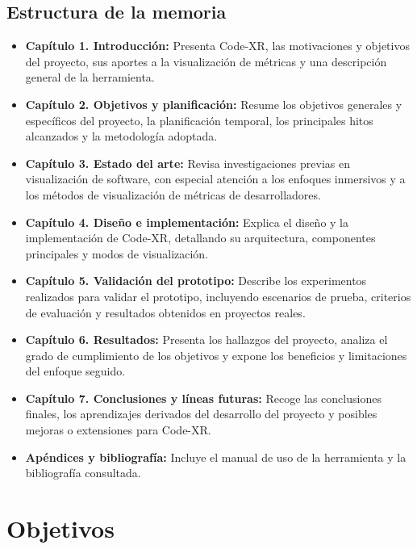 \documentclass[a4paper, 12pt]{book}
\begin{document}
\section{Estructura de la memoria}
\label{sec:estructura}
\begin{itemize}
    \item \textbf{Capítulo 1. Introducción:} Presenta Code-XR, las motivaciones y objetivos del proyecto, sus aportes a la visualización de métricas y una descripción general de la herramienta.
    \item \textbf{Capítulo 2. Objetivos y planificación:} Resume los objetivos generales y específicos del proyecto, la planificación temporal, los principales hitos alcanzados y la metodología adoptada.
    \item \textbf{Capítulo 3. Estado del arte:} Revisa investigaciones previas en visualización de software, con especial atención a los enfoques inmersivos y a los métodos de visualización de métricas de desarrolladores.
    \item \textbf{Capítulo 4. Diseño e implementación:} Explica el diseño y la implementación de Code-XR, detallando su arquitectura, componentes principales y modos de visualización.
    \item \textbf{Capítulo 5. Validación del prototipo:} Describe los experimentos realizados para validar el prototipo, incluyendo escenarios de prueba, criterios de evaluación y resultados obtenidos en proyectos reales.
    \item \textbf{Capítulo 6. Resultados:} Presenta los hallazgos del proyecto, analiza el grado de cumplimiento de los objetivos y expone los beneficios y limitaciones del enfoque seguido.
    \item \textbf{Capítulo 7. Conclusiones y líneas futuras:} Recoge las conclusiones finales, los aprendizajes derivados del desarrollo del proyecto y posibles mejoras o extensiones para Code-XR.
    \item \textbf{Apéndices y bibliografía:} Incluye el manual de uso de la herramienta y la bibliografía consultada.
\end{itemize}



\cleardoublepage %
\chapter{Objetivos} %
\label{chap:objetivos} %
\end{document}
